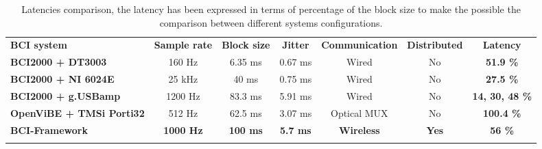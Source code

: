 
\begin{table}
\begin{centering}
\begin{tabular}{>{\raggedright}p{3.3cm}cccccc}
\toprule 
\addlinespace[1em]
\textbf{BCI system} & \textbf{Sample rate} & \textbf{Block size} & \textbf{Jitter} & \textbf{Communication} & \textbf{Distributed} & \textbf{Latency}\tabularnewline\addlinespace[1em]
\midrule
\addlinespace[1em]
\textbf{BCI2000 + DT3003 \cite{schalk2004bci2000}} & 160 Hz & 6.35 ms & 0.67 ms & Wired & No & \textbf{51.9 \%}\tabularnewline
\addlinespace[0.5cm]
\textbf{BCI2000 + NI 6024E \cite{schalk2004bci2000}} & 25 kHz & 40 ms & 0.75 ms & Wired & No & \textbf{27.5 \%}\tabularnewline
\addlinespace[0.5cm]
\textbf{BCI2000 + g.USBamp \cite{wilson2010procedure}} & 1200 Hz & 83.3 ms & 5.91 ms & Wired & No & \textbf{14, 30, 48 \%}\tabularnewline
\addlinespace[0.5cm]
\textbf{OpenViBE + TMSi Porti32 \cite{kisakye2013brain}} & 512 Hz & 62.5 ms & 3.07 ms & Optical MUX & No & \textbf{100.4 \%}\tabularnewline
\addlinespace[0.5cm]
\textbf{BCI-Framework} & \textbf{1000 Hz} & \textbf{100 ms} & \textbf{5.7 ms} & \textbf{Wireless} & \textbf{Yes} & \textbf{56 \%}\tabularnewline\addlinespace[1em]
\bottomrule
\addlinespace[0.5cm]
\end{tabular}
\par\end{centering}
\caption{Latencies comparison, the latency has been expressed in terms of percentage of the block size to make the possible the comparison between different systems configurations.\label{table:latencies-comparison}}
\end{table}


